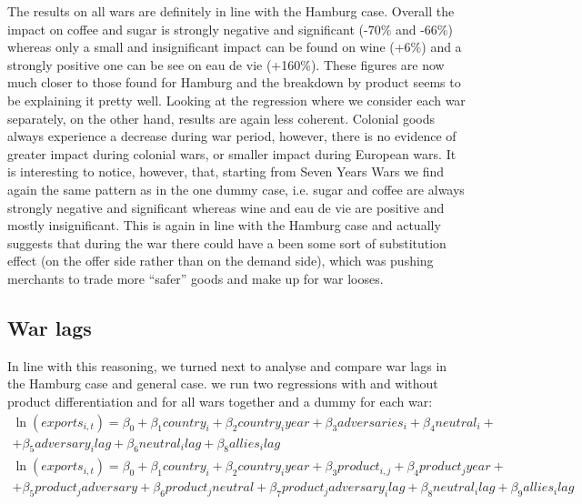 \documentclass[12pt,a4paper,titlepage,english]{article}
\begin{document}
The results on all wars are definitely in line with the Hamburg case. Overall the impact on coffee and sugar is strongly negative and significant (-70\% and -66\%) whereas only a small and insignificant impact can be found on wine (+6\%) and a strongly positive one can be see on eau de vie (+160\%). These figures are now much closer to those found for Hamburg and the breakdown by product seems to be explaining it pretty well. Looking at the regression where we consider each war separately, on the other hand, results are again less coherent. Colonial goods always experience a decrease during war period, however, there is no evidence of greater impact during colonial wars, or smaller impact during European wars. It is interesting to notice, however, that, starting from Seven Years Wars we find again the same pattern as in the one dummy case, i.e. sugar and coffee are always strongly negative and significant whereas wine and eau de vie are positive and mostly insignificant. This is again in line with the Hamburg case and actually suggests that during the war there could have a been some sort of substitution effect (on the offer side rather than on the demand side), which was pushing merchants to trade more “safer” goods and make up for war looses.\\

\iffalse
\subsection{War lags}
In line with this reasoning, we turned next to analyse and compare war lags in the Hamburg case and general case. we run two regressions with and without product differentiation and for all wars together and a dummy for each war: 
\begin{multline}
\ln(exports_{i,t})=\beta_0+\beta_1country_i+\beta_2country_iyear+\beta_3adversaries_i+\beta_4neutral_i+\\+\beta_5adversary_ilag+\beta_6neutral_ilag+\beta_8allies_ilag
\end{multline}
\begin{multline}
\ln(exports_{i,t})=\beta_0+\beta_1country_i+\beta_2country_iyear+\beta_3product_{i,j}+\beta_4product_jyear+\\+\beta_5product_jadversary+ \beta_6product_jneutral+\beta_7product_jadversary_ilag+\beta_8neutral_ilag+\beta_9allies_ilag
\end{multline}
\end{document}
